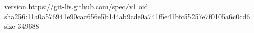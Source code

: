 version https://git-lfs.github.com/spec/v1
oid sha256:11a0a576941e90cac656e5b144ab9cde0a741f5e41bfc55257e7f0105a6c0cd6
size 349688

